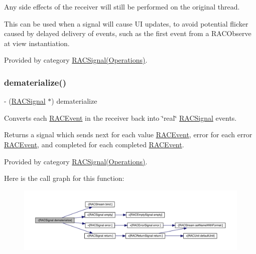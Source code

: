Any side effects of the receiver will still be performed on the original thread.

This can be used when a signal will cause UI updates, to avoid potential flicker caused by delayed delivery of events, such as the first event from a R\+A\+C\+Observe at view instantiation. 

Provided by category \mbox{\hyperlink{category_r_a_c_signal_07_operations_08_a0c7042ce0eb6c729bc38421295296db1}{R\+A\+C\+Signal(\+Operations)}}.

\mbox{\label{interface_r_a_c_signal_aa5b197f63d89c698c8cbfc749ea15440}} 
\subsubsection{\texorpdfstring{dematerialize()}{dematerialize()}\hspace{0.1cm}{\footnotesize\ttfamily [1/3]}}
{\footnotesize\ttfamily -\/ (\mbox{\hyperlink{interface_r_a_c_signal}{R\+A\+C\+Signal}} $\ast$) dematerialize \begin{DoxyParamCaption}{ }\end{DoxyParamCaption}}

Converts each \mbox{\hyperlink{interface_r_a_c_event}{R\+A\+C\+Event}} in the receiver back into \char`\"{}real\char`\"{} \mbox{\hyperlink{interface_r_a_c_signal}{R\+A\+C\+Signal}} events.

Returns a signal which sends {\ttfamily next} for each value \mbox{\hyperlink{interface_r_a_c_event}{R\+A\+C\+Event}}, {\ttfamily error} for each error \mbox{\hyperlink{interface_r_a_c_event}{R\+A\+C\+Event}}, and {\ttfamily completed} for each completed \mbox{\hyperlink{interface_r_a_c_event}{R\+A\+C\+Event}}. 

Provided by category \mbox{\hyperlink{category_r_a_c_signal_07_operations_08_aa5b197f63d89c698c8cbfc749ea15440}{R\+A\+C\+Signal(\+Operations)}}.

Here is the call graph for this function\+:\nopagebreak
\begin{figure}[H]
\begin{center}
\leavevmode
\includegraphics[width=350pt]{interface_r_a_c_signal_aa5b197f63d89c698c8cbfc749ea15440_cgraph}
\end{center}
\end{figure}
\mbox{\label{interface_r_a_c_signal_aa5b197f63d89c698c8cbfc749ea15440}} 
